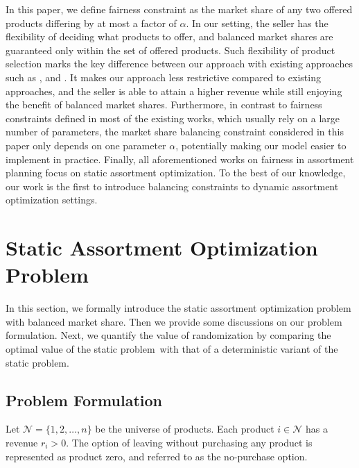 \documentclass[mnsc,non-blindrev]{informs3}
\theoremstyle{definition}
\begin{document}
In this paper, we define fairness constraint as the market share of any two offered products differing by at most a factor of $\alpha$. {  In our setting, the seller has the flexibility of deciding what products to offer, and balanced market shares are guaranteed only within the set of offered products. Such flexibility of product selection marks the key difference between our approach with existing approaches such as \cite{chen2022fair}, \cite{lu2023simple} and \cite{barre2023assortment}. It makes our approach less restrictive compared to existing approaches, and the seller is able to attain a higher revenue while still enjoying the benefit of balanced market shares.} Furthermore, in contrast to fairness constraints defined in most of the existing works, which usually rely on a large number of parameters, the market share balancing constraint considered in this paper only depends on one parameter $\alpha$, potentially making our model easier to implement in practice. Finally, all aforementioned works on fairness in assortment planning focus on static assortment optimization. To the best of our knowledge, our work is the first to introduce balancing constraints to dynamic assortment optimization settings.

\section{Static Assortment Optimization Problem}

In this section, we formally introduce the static assortment optimization problem with balanced market share. {  Then we provide some discussions on our problem formulation.} Next, we quantify the value of randomization by comparing the optimal value of the static problem~with that of a deterministic variant of the static problem.

\subsection{Problem Formulation}\label{sec:definition_static}

Let $\mathcal{N}=\{1,2,\dots,n\}$ be the universe of products. Each product $i\in\mathcal{N}$ has a revenue $r_i>0$. The option of leaving without purchasing any product is represented as product zero, and referred to as the no-purchase option.
\end{document}
